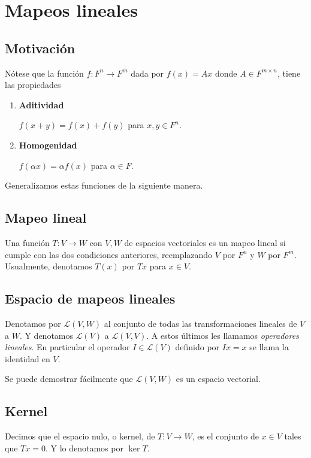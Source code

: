 \documentclass{article}
\begin{document}
\newpage

\section{Mapeos lineales}
\subsection{Motivación}
Nótese que la función $f: F^n \rightarrow F^m$ dada por
$f(x) = Ax$ donde $A\in F^{m\times n}$, tiene las propiedades
\begin{enumerate}
    \item \textbf{Aditividad}

    $f(x+y) = f(x) + f(y)$ para $x,y\in F^n$.

    \item \textbf{Homogenidad}

    $f(\alpha x) = \alpha f(x)$ para $\alpha\in F$.
\end{enumerate}
Generalizamos estas funciones de la siguiente manera.

\subsection{Mapeo lineal}
Una función $T: V\rightarrow W$ con $V,W$ de espacios vectoriales es
un mapeo lineal si cumple con las dos condiciones anteriores, reemplazando $V$ por $F^n$ y $W$ por $F^m$. Usualmente,
denotamos $T(x)$ por $Tx$ para $x\in V$.

\subsection{Espacio de mapeos lineales}
Denotamos por $\mathcal{L}(V,W)$ al conjunto de todas
las transformaciones lineales de $V$ a $W$.
Y denotamos $\mathcal{L}(V)$ a $\mathcal{L}(V, V)$. A estos últimos
les llamamos \textit{operadores lineales}. En particular el operador
$I\in\mathcal{L}(V)$ definido por $Ix=x$ se llama la identidad en $V$.

Se puede demostrar fácilmente que $\mathcal{L}(V,W)$ es un espacio vectorial.

\subsection{Kernel}
Decimos que el espacio nulo, o kernel, de $T: V \rightarrow W$, es el conjunto de $x\in V$ tales que $Tx=0$. Y lo denotamos por
$\ker T$.
\end{document}
